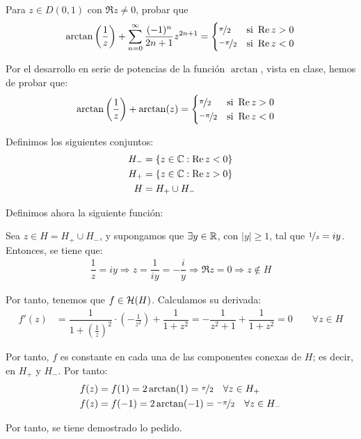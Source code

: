 \begin{ejercicio}
    Para $z \in D(0,1)$ con $\Re z \neq 0$, probar que
    \[
        \arctan\left(\frac{1}{z}\right) + \sum_{n=0}^\infty \frac{(-1)^n}{2n+1}z^{2n+1} = \begin{cases}
            \nicefrac{\pi}{2} & \text{si } \Re z > 0 \\
            \nicefrac{-\pi}{2} & \text{si } \Re z < 0
        \end{cases}
    \]

    Por el desarrollo en serie de potencias de la función $\arctan$, vista en clase, hemos de probar que:
    \begin{align*}
        \arctan\left(\frac{1}{z}\right) + \arctan(z) &= \begin{cases}
            \nicefrac{\pi}{2} & \text{si } \Re z > 0 \\
            \nicefrac{-\pi}{2} & \text{si } \Re z < 0
        \end{cases}
    \end{align*}

    Definimos los siguientes conjuntos:
    \begin{align*}
        H_{-} &= \{z\in \bb{C} : \Re z < 0\} \\
        H_{+} &= \{z\in \bb{C} : \Re z > 0\} \\
        H&= H_{+}\cup H_{-}
    \end{align*}

    Definimos ahora la siguiente función:

    Sea $z\in H=H_+\cup H_-$, y supongamos que $\exists y\in \bb{R}$, con $|y|\geq 1$, tal que $\nicefrac{1}{z}=iy$. Entonces, se tiene que:
    \begin{align*}
        \dfrac{1}{z}=iy\Longrightarrow z = \dfrac{1}{iy} = -\dfrac{i}{y}
        \Longrightarrow \Re z = 0\Longrightarrow z\notin H
    \end{align*}

    Por tanto, tenemos que $f\in \cc{H}(H)$. Calculamos su derivada:
    \begin{align*}
        f'(z) &= \dfrac{1}{1+\left(\frac{1}{z}\right)^2}\cdot \left(-\frac{1}{z^2}\right) + \dfrac{1}{1+z^2} = -\dfrac{1}{z^2+1}+\dfrac{1}{1+z^2} = 0\qquad \forall z\in H
    \end{align*}

    Por tanto, $f$ es constante en cada una de las componentes conexas de $H$; es decir, en $H_+$ y $H_-$. Por tanto:
    \begin{align*}
        f(z) &= f(1)=2\arctan(1)=\nicefrac{\pi}{2} \quad \forall z\in H_+\\
        f(z) &= f(-1)=2\arctan(-1)=\nicefrac{-\pi}{2} \quad \forall z\in H_-
    \end{align*}

    Por tanto, se tiene demostrado lo pedido.
\end{ejercicio}